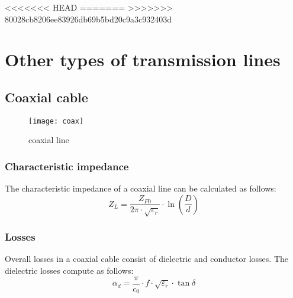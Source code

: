 %
%
<<<<<<< HEAD
=======
>>>>>>> 80028cb8206ee83926db69b5bd20c9a3c932403d
%
%

\chapter{Other types of transmission lines}

\section{Coaxial cable}

\begin{figure}[ht]
\begin{center}
\texttt{[image: coax]}
\end{center}
\caption{coaxial line}
\label{fig:coax}
\end{figure}
\FloatBarrier

\subsection{Characteristic impedance}

The characteristic impedance of a coaxial line can be calculated as follows:
\begin{equation}
Z_L = \dfrac{Z_{F0}}{2\pi\cdot\sqrt{\varepsilon_r}}\cdot\ln{\left(\dfrac{D}{d}\right)}
\end{equation}

\subsection{Losses}

Overall losses in a coaxial cable consist of dielectric and conductor
losses.  The dielectric losses compute as follows:
\begin{equation}
\alpha_d = \dfrac{\pi}{c_0}\cdot f\cdot \sqrt{\varepsilon_r} \cdot \tan{\delta}
\end{equation}

